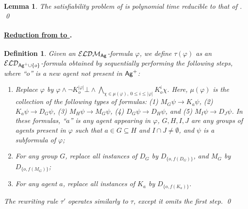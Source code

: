 \documentclass{article}
\newtheorem{definition}[theorem]{Definition}%
\newtheorem{lemma}[theorem]{Lemma}%
\newcommand{\ag}{\text{\normalfont\textsf{Ag}}\xspace}
\renewcommand{\phi}{\varphi}
\newcommand{\ra}{\rightarrow}
\newcommand{\langd}{\ensuremath{\mathcal{ELD}}\xspace}
\newcommand{\langdm}{\ensuremath{\mathcal{ELDM}}\xspace}
\newcommand{\ld}{\text{\normalfont ELD}\xspace}
\newcommand{\ldm}{\text{\normalfont ELDM}\xspace}
\newcommand{\lsdm}{\text{\normalfont ELDM$^s$}\xspace}
\begin{document}
\begin{lemma}\label{lem:red-sdm2dm}
The satisfiability problem of \lsdm is polynomial time reducible to that of \ldm.
\qed
\end{lemma}


\paragraph{\bfseries\underline{Reduction from \ldm to \ld}.}
\begin{definition}\label{def:rewrite-d}
Given an $\langdm_\ag$-formula $\phi$, we define $\tau(\phi)$ as an $\langd_{\ag^+\cup\{o\}}$-formula obtained by sequentially performing the following steps, where ``$o$'' is a new agent not present in $\ag^+$:
\begin{enumerate}
\item Replace $\phi$ by $\phi \wedge \neg K_o^{|\phi|}\bot \wedge \bigwedge_{\chi \in \mu(\phi),\ 0\leq i\leq |\phi|} K_o^i \chi$. Here, $\mu(\phi)$ is the collection of the following types of formulas:
(1) $M_G \psi \ra K_a\psi$, (2) $K_a\psi \ra D_G\psi$, (3) $M_H\psi \ra M_G\psi$, (4) $D_G \psi \ra D_H\psi$, and (5) $M_I\psi \ra D_J\psi$.
In these formulas, ``$a$'' is any agent appearing in $\phi$, $G, H, I, J$ are any groups of agents present in $\phi$ such that $a \in G \subseteq H$ and $I \cap J \neq \emptyset$, and $\psi$ is a subformula of $\phi$;

\item For any group $G$, replace all instances of $D_G$ by $D_{\{o,f(D_G)\}}$, and $M_G$ by $D_{\{o,f(M_G)\}}$;

\item For any agent $a$, replace all instances of $K_a$ by $D_{\{o,f(K_a)\}}$.
\end{enumerate}
The rewriting rule $\tau'$ operates similarly to $\tau$, except it omits the first step.
\qed
\end{definition}
\end{document}
